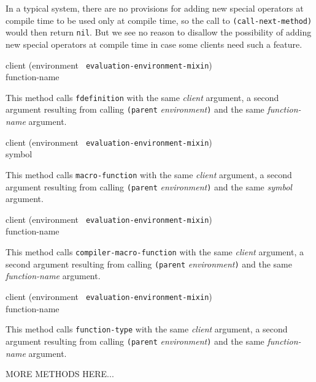In a typical system, there are no provisions for adding new special
operators at compile time to be used only at compile time, so the call
to \texttt{(call-next-method)} would then return \texttt{nil}.  But we
see no reason to disallow the possibility of adding new special
operators at compile time in case some clients need such a feature.

{\small{} {client (environment {\tt
      evaluation-environment-mixin}) \\ function-name}
}

This method calls \texttt{fdefinition} with the same \textit{client}
argument, a second argument resulting from calling \texttt{(parent}
\textit{environment}\texttt{)} and the same \textit{function-name}
argument.

{\small{} {client (environment {\tt
      evaluation-environment-mixin}) \\ symbol}
}

This method calls \texttt{macro-function} with the same
\textit{client} argument, a second argument resulting from calling
\texttt{(parent} \textit{environment}\texttt{)} and the same
\textit{symbol} argument.

{\small{} {client (environment {\tt
      evaluation-environment-mixin}) \\ function-name}
}

This method calls \texttt{compiler-macro-function} with the same
\textit{client} argument, a second argument resulting from calling
\texttt{(parent} \textit{environment}\texttt{)} and the same
  \textit{function-name} argument.

{\small{} {client (environment {\tt
      evaluation-environment-mixin}) \\ function-name}
}

This method calls \texttt{function-type} with the same \textit{client}
argument, a second argument resulting from calling \texttt{(parent}
\textit{environment}\texttt{)} and the same \textit{function-name}
argument.

MORE METHODS HERE...
